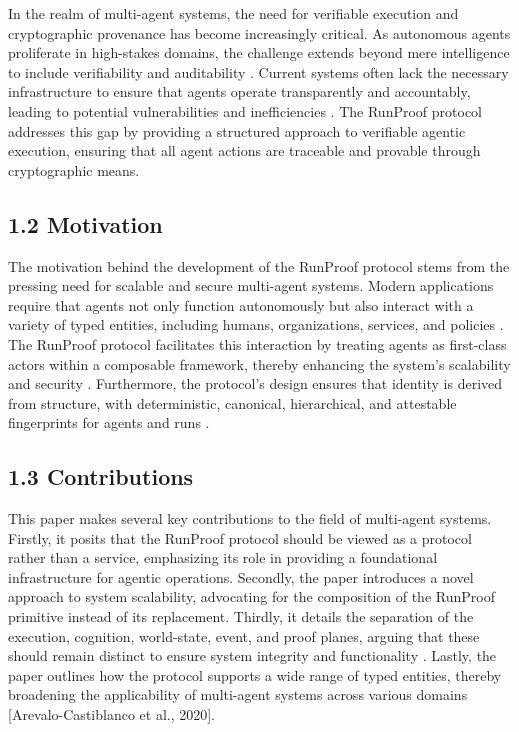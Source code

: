 \documentclass[11pt]{article}
\begin{document}
In the realm of multi-agent systems, the need for verifiable execution and cryptographic provenance has become increasingly critical. As autonomous agents proliferate in high-stakes domains, the challenge extends beyond mere intelligence to include verifiability and auditability \cite{Li2025}. Current systems often lack the necessary infrastructure to ensure that agents operate transparently and accountably, leading to potential vulnerabilities and inefficiencies \cite{Moslemi2026}. The RunProof protocol addresses this gap by providing a structured approach to verifiable agentic execution, ensuring that all agent actions are traceable and provable through cryptographic means.

\subsection{1.2 Motivation}

The motivation behind the development of the RunProof protocol stems from the pressing need for scalable and secure multi-agent systems. Modern applications require that agents not only function autonomously but also interact with a variety of typed entities, including humans, organizations, services, and policies \cite{Zhu2022}. The RunProof protocol facilitates this interaction by treating agents as first-class actors within a composable framework, thereby enhancing the system's scalability and security \cite{Li2011}. Furthermore, the protocol's design ensures that identity is derived from structure, with deterministic, canonical, hierarchical, and attestable fingerprints for agents and runs \cite{Shore2025}.

\subsection{1.3 Contributions}

This paper makes several key contributions to the field of multi-agent systems. Firstly, it posits that the RunProof protocol should be viewed as a protocol rather than a service, emphasizing its role in providing a foundational infrastructure for agentic operations. Secondly, the paper introduces a novel approach to system scalability, advocating for the composition of the RunProof primitive instead of its replacement. Thirdly, it details the separation of the execution, cognition, world-state, event, and proof planes, arguing that these should remain distinct to ensure system integrity and functionality \cite{Guezouri2010}. Lastly, the paper outlines how the protocol supports a wide range of typed entities, thereby broadening the applicability of multi-agent systems across various domains [Arevalo-Castiblanco et al., 2020].
\end{document}
